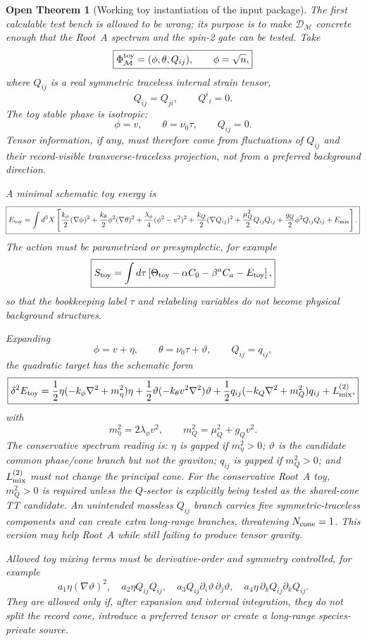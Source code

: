 \documentclass[11pt]{article}
\newtheorem{openthm}{Open Theorem}
\begin{document}
\begin{openthm}[Working toy instantiation of the input package]
The first calculable test bench is allowed to be wrong; its purpose is to make
\(\mathcal D_{\mathcal M}\) concrete enough that the Root~A spectrum and the
spin-2 gate can be tested.  Take
\[
\boxed{
\Phi_{\mathcal M}^{\rm toy}
=
(\phi,\theta,Q_{ij}),
\qquad
\phi=\sqrt n,
}
\]
where \(Q_{ij}\) is a real symmetric traceless internal strain tensor,
\[
\boxed{
Q_{ij}=Q_{ji},
\qquad
Q^i{}_i=0.
}
\]
The toy stable phase is isotropic:
\[
\boxed{
\phi=v,\qquad
\theta=\nu_0\tau,\qquad
Q_{ij}=0.
}
\]
Tensor information, if any, must therefore come from fluctuations of
\(Q_{ij}\) and their record-visible transverse-traceless projection, not from a
preferred background direction.

A minimal schematic toy energy is
\[
\boxed{
E_{\rm toy}
=
\int d^3X
\left[
\frac{k_\phi}{2}(\nabla\phi)^2
+\frac{k_\theta}{2}\phi^2(\nabla\theta)^2
+\frac{\lambda_\phi}{4}(\phi^2-v^2)^2
+\frac{k_Q}{2}(\nabla Q_{ij})^2
+\frac{\mu_Q^2}{2}Q_{ij}Q_{ij}
+\frac{g_Q}{2}\phi^2Q_{ij}Q_{ij}
+E_{\rm mix}
\right].
}
\]
The action must be parametrized or presymplectic, for example
\[
\boxed{
S_{\rm toy}
=
\int d\tau
\left[
\Theta_{\rm toy}
-\alpha C_0
-\beta^a C_a
-E_{\rm toy}
\right],
}
\]
so that the bookkeeping label \(\tau\) and relabeling variables do not become
physical background structures.

Expanding
\[
\boxed{
\phi=v+\eta,
\qquad
\theta=\nu_0\tau+\vartheta,
\qquad
Q_{ij}=q_{ij},
}
\]
the quadratic target has the schematic form
\[
\boxed{
\delta^2E_{\rm toy}
=
\frac12\eta(-k_\phi\nabla^2+m_\eta^2)\eta
+\frac12\vartheta(-k_\theta v^2\nabla^2)\vartheta
+\frac12q_{ij}(-k_Q\nabla^2+m_Q^2)q_{ij}
+L_{\rm mix}^{(2)},
}
\]
with
\[
\boxed{
m_\eta^2=2\lambda_\phi v^2,
\qquad
m_Q^2=\mu_Q^2+g_Qv^2.
}
\]
The conservative spectrum reading is: \(\eta\) is gapped if \(m_\eta^2>0\);
\(\vartheta\) is the candidate common phase/cone branch but not the graviton;
\(q_{ij}\) is gapped if \(m_Q^2>0\); and \(L_{\rm mix}^{(2)}\) must not change
the principal cone.  For the conservative Root~A toy, \(m_Q^2>0\) is required
unless the \(Q\)-sector is explicitly being tested as the shared-cone TT
candidate.  An unintended massless \(Q_{ij}\) branch carries five
symmetric-traceless components and can create extra long-range branches,
threatening \(N_{\rm cone}=1\).  This version may help Root~A while still
failing to produce tensor gravity.

Allowed toy mixing terms must be derivative-order and symmetry controlled, for
example
\[
\boxed{
a_1\eta(\nabla\vartheta)^2,\quad
a_2\eta Q_{ij}Q_{ij},\quad
a_3Q_{ij}\partial_i\vartheta\,\partial_j\vartheta,\quad
a_4\eta\,\partial_kQ_{ij}\partial_kQ_{ij}.
}
\]
They are allowed only if, after expansion and internal integration, they do
not split the record cone, introduce a preferred tensor or create a long-range
species-private source.


\end{openthm}
\end{document}
